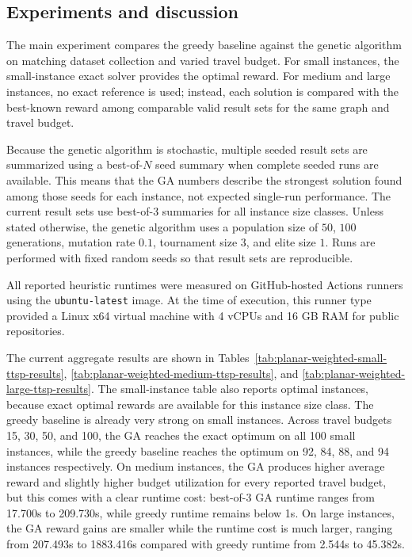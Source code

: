 \documentclass[report,english,cleveref,autoref,a4paper]{lipics-v2021}
\begin{document}
\subsection{Experiments and discussion}
\label{subsec:experiments}
The main experiment compares the greedy baseline against the genetic algorithm
on matching dataset collection and varied travel budget. For small instances, the
small-instance exact solver provides the optimal reward. For medium and large instances, no exact
reference is used; instead, each solution is compared with the best-known reward
among comparable valid result sets for the same graph and travel budget.

Because the genetic algorithm is stochastic, multiple seeded result sets are
summarized using a best-of-$N$ seed summary when complete seeded runs are
available. This means that the GA numbers describe the strongest solution found
among those seeds for each instance, not expected single-run performance. The
current result sets use best-of-3 summaries for all instance size classes.
Unless stated otherwise, the genetic algorithm uses a population size of $50$,
$100$ generations, mutation rate $0.1$, tournament size $3$, and elite size
$1$. Runs are performed with fixed random seeds so that result sets are
reproducible.

All reported heuristic runtimes were measured on GitHub-hosted Actions runners
using the \texttt{ubuntu-latest} image. At the time of execution, this runner
type provided a Linux x64 virtual machine with 4 vCPUs and 16 GB RAM for public
repositories.

The current aggregate results are shown in
Tables~\ref{tab:planar-weighted-small-ttsp-results},
\ref{tab:planar-weighted-medium-ttsp-results}, and
\ref{tab:planar-weighted-large-ttsp-results}.
The small-instance table also reports optimal instances, because exact optimal
rewards are available for this instance size class.
The greedy baseline is already very strong on small instances. Across travel
budgets 15, 30, 50, and 100, the GA reaches the exact optimum on all 100 small
instances, while the greedy baseline reaches the optimum on 92, 84, 88, and 94
instances respectively. On medium instances, the GA produces higher average
reward and slightly higher budget utilization for every reported travel budget,
but this comes with a clear runtime cost: best-of-3 GA runtime ranges from
17.700s to 209.730s, while greedy runtime remains below 1s. On large instances,
the GA reward gains are smaller while the runtime cost is much larger, ranging
from 207.493s to 1883.416s compared with greedy runtime from 2.544s to 45.382s.
\end{document}
